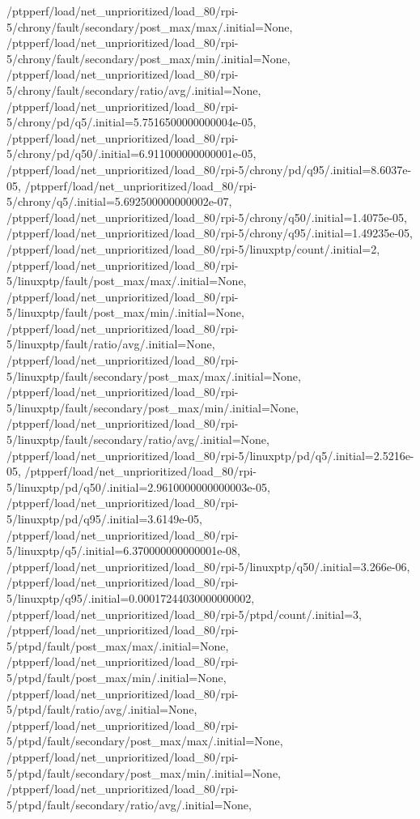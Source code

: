 {    /ptpperf/load/net_unprioritized/load_80/rpi-5/chrony/fault/secondary/post_max/max/.initial=None,
    /ptpperf/load/net_unprioritized/load_80/rpi-5/chrony/fault/secondary/post_max/min/.initial=None,
    /ptpperf/load/net_unprioritized/load_80/rpi-5/chrony/fault/secondary/ratio/avg/.initial=None,
    /ptpperf/load/net_unprioritized/load_80/rpi-5/chrony/pd/q5/.initial=5.7516500000000004e-05,
    /ptpperf/load/net_unprioritized/load_80/rpi-5/chrony/pd/q50/.initial=6.911000000000001e-05,
    /ptpperf/load/net_unprioritized/load_80/rpi-5/chrony/pd/q95/.initial=8.6037e-05,
    /ptpperf/load/net_unprioritized/load_80/rpi-5/chrony/q5/.initial=5.692500000000002e-07,
    /ptpperf/load/net_unprioritized/load_80/rpi-5/chrony/q50/.initial=1.4075e-05,
    /ptpperf/load/net_unprioritized/load_80/rpi-5/chrony/q95/.initial=1.49235e-05,
    /ptpperf/load/net_unprioritized/load_80/rpi-5/linuxptp/count/.initial=2,
    /ptpperf/load/net_unprioritized/load_80/rpi-5/linuxptp/fault/post_max/max/.initial=None,
    /ptpperf/load/net_unprioritized/load_80/rpi-5/linuxptp/fault/post_max/min/.initial=None,
    /ptpperf/load/net_unprioritized/load_80/rpi-5/linuxptp/fault/ratio/avg/.initial=None,
    /ptpperf/load/net_unprioritized/load_80/rpi-5/linuxptp/fault/secondary/post_max/max/.initial=None,
    /ptpperf/load/net_unprioritized/load_80/rpi-5/linuxptp/fault/secondary/post_max/min/.initial=None,
    /ptpperf/load/net_unprioritized/load_80/rpi-5/linuxptp/fault/secondary/ratio/avg/.initial=None,
    /ptpperf/load/net_unprioritized/load_80/rpi-5/linuxptp/pd/q5/.initial=2.5216e-05,
    /ptpperf/load/net_unprioritized/load_80/rpi-5/linuxptp/pd/q50/.initial=2.9610000000000003e-05,
    /ptpperf/load/net_unprioritized/load_80/rpi-5/linuxptp/pd/q95/.initial=3.6149e-05,
    /ptpperf/load/net_unprioritized/load_80/rpi-5/linuxptp/q5/.initial=6.370000000000001e-08,
    /ptpperf/load/net_unprioritized/load_80/rpi-5/linuxptp/q50/.initial=3.266e-06,
    /ptpperf/load/net_unprioritized/load_80/rpi-5/linuxptp/q95/.initial=0.00017244030000000002,
    /ptpperf/load/net_unprioritized/load_80/rpi-5/ptpd/count/.initial=3,
    /ptpperf/load/net_unprioritized/load_80/rpi-5/ptpd/fault/post_max/max/.initial=None,
    /ptpperf/load/net_unprioritized/load_80/rpi-5/ptpd/fault/post_max/min/.initial=None,
    /ptpperf/load/net_unprioritized/load_80/rpi-5/ptpd/fault/ratio/avg/.initial=None,
    /ptpperf/load/net_unprioritized/load_80/rpi-5/ptpd/fault/secondary/post_max/max/.initial=None,
    /ptpperf/load/net_unprioritized/load_80/rpi-5/ptpd/fault/secondary/post_max/min/.initial=None,
    /ptpperf/load/net_unprioritized/load_80/rpi-5/ptpd/fault/secondary/ratio/avg/.initial=None,
}
